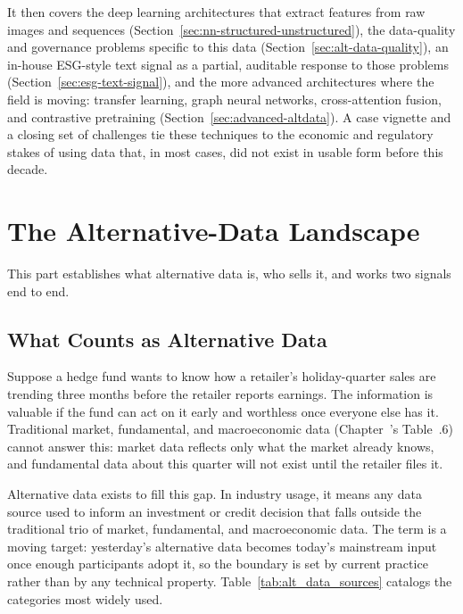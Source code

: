 \documentclass[../ai_in_finance]{subfiles}
\begin{document}
It then covers the deep learning architectures that extract features from raw images and sequences (Section~\ref{sec:nn-structured-unstructured}), the data-quality and governance problems specific to this data (Section~\ref{sec:alt-data-quality}), an in-house ESG-style text signal as a partial, auditable response to those problems (Section~\ref{sec:esg-text-signal}), and the more advanced architectures where the field is moving: transfer learning, graph neural networks, cross-attention fusion, and contrastive pretraining (Section~\ref{sec:advanced-altdata}). A case vignette and a closing set of challenges tie these techniques to the economic and regulatory stakes of using data that, in most cases, did not exist in usable form before this decade.

\section{The Alternative-Data Landscape}

This part establishes what alternative data is, who sells it, and works two signals end to end.

\subsection{What Counts as Alternative Data}
\label{sec:alt-data-sources}

Suppose a hedge fund wants to know how a retailer's holiday-quarter sales are trending three months before the retailer reports earnings. The information is valuable if the fund can act on it early and worthless once everyone else has it. Traditional market, fundamental, and macroeconomic data (Chapter~'s Table~.6) cannot answer this: market data reflects only what the market already knows, and fundamental data about this quarter will not exist until the retailer files it.

Alternative data exists to fill this gap. In industry usage, it means any data source used to inform an investment or credit decision that falls outside the traditional trio of market, fundamental, and macroeconomic data. The term is a moving target: yesterday's alternative data becomes today's mainstream input once enough participants adopt it, so the boundary is set by current practice rather than by any technical property. Table~\ref{tab:alt_data_sources} catalogs the categories most widely used.
\end{document}
